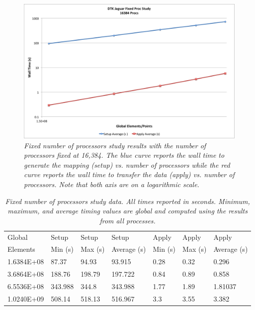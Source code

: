 \documentclass[note]{TechNote}
\begin{document}
\begin{figure}[htpb!]
  \centering
  \includegraphics[width=5.5in]{FixedProc.png}
  \caption{\sl Fixed number of processors study results with the
    number of processors fixed at 16,384. The blue curve reports the
    wall time to generate the mapping (setup) vs. number of processors
    while the red curve reports the wall time to transfer the data
    (apply) vs. number of processors. Note that both axis are on a
    logarithmic scale. }
  \label{fig:fixed_proc}
\end{figure}

\begin{table}[htpb!]
  \begin{center}
    \begin{tabular}{lllllll}\hline\hline
      \multicolumn{1}{l}{Global} & 
      \multicolumn{1}{l}{Setup} & 
      \multicolumn{1}{l}{Setup} & 
      \multicolumn{1}{l}{Setup} & 
      \multicolumn{1}{l}{Apply} & 
      \multicolumn{1}{l}{Apply} & 
      \multicolumn{1}{l}{Apply}\\
      \multicolumn{1}{l}{Elements} & 
      \multicolumn{1}{l}{Min (s)} & 
      \multicolumn{1}{l}{Max (s)} & 
      \multicolumn{1}{l}{Average (s)} & 
      \multicolumn{1}{l}{Min (s)} & 
      \multicolumn{1}{l}{Max (s)} & 
      \multicolumn{1}{l}{Average (s)}\\ \hline\hline
1.6384E+08 & 87.37&	94.93 &	93.915 &	0.28 &	0.32 &	0.296 \\
3.6864E+08 & 188.76 &	198.79 &	197.722 &	0.84 &	0.89 &	0.858 \\
6.5536E+08 & 343.988 &       344.8 &	343.988 & 1.77 &	1.89 &	1.81037 \\
1.0240E+09 & 508.14 &	518.13 &	516.967 &	3.3 &	3.55 &	3.382 \\
      \hline\hline
    \end{tabular}
  \end{center}
  \caption{\sl Fixed number of processors study data. All times
    reported in seconds. Minimum, maximum, and average timing values
    are global and computed using the results from all processes.}
  \label{tab:fixed_proc}
\end{table}
\end{document}
